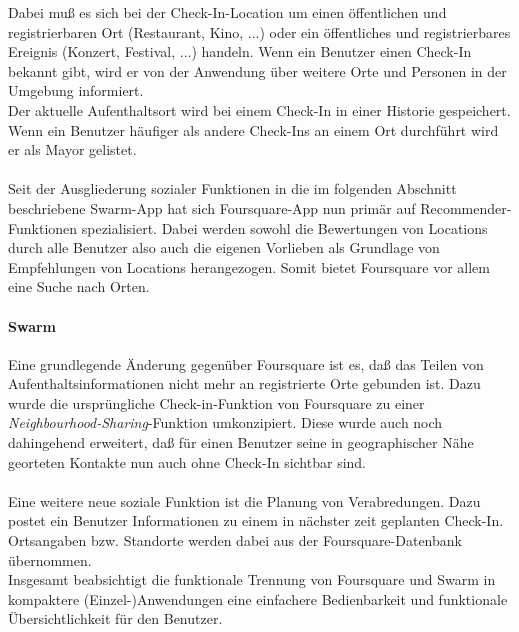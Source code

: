 Dabei muß es sich bei der Check-In-Location um
einen öffentlichen und registrierbaren Ort (Restaurant, Kino, ...) oder ein öffentliches und registrierbares Ereignis (Konzert, Festival, ...) handeln.
Wenn ein Benutzer einen Check-In bekannt gibt, wird er von der Anwendung über weitere Orte und Personen in der Umgebung informiert.\\
Der aktuelle Aufenthaltsort wird bei einem Check-In in einer Historie gespeichert. Wenn 
ein Benutzer häufiger als andere Check-Ins an einem Ort durchführt wird er als Mayor gelistet.\\ \\
Seit der Ausgliederung sozialer Funktionen in die im folgenden Abschnitt beschriebene Swarm-App hat
sich Foursquare-App nun primär auf
Recommender-Funktionen
spezialisiert. Dabei werden sowohl die Bewertungen von Locations durch alle Benutzer also auch die eigenen Vorlieben als Grundlage
von Empfehlungen von Locations herangezogen. Somit bietet Foursquare vor allem eine Suche nach Orten.%

\paragraph[Swarm]{Swarm}
Eine grundlegende Änderung gegenüber Foursquare ist es, daß das Teilen von Aufenthaltsinformationen nicht mehr an registrierte Orte gebunden ist. Dazu wurde die ursprüngliche Check-in-Funktion von Foursquare zu einer \textit{Neighbourhood-Sharing}-Funktion umkonzipiert. Diese wurde auch noch dahingehend erweitert, daß für einen Benutzer seine in geographischer Nähe georteten Kontakte nun auch ohne Check-In sichtbar sind.\\ \\
Eine weitere neue soziale Funktion ist die Planung von Verabredungen. Dazu postet ein Benutzer Informationen zu einem in nächster zeit geplanten Check-In. Ortsangaben bzw. Standorte werden dabei aus der Foursquare-Datenbank übernommen.\\
Insgesamt beabsichtigt die funktionale Trennung von Foursquare und Swarm in kompaktere (Einzel-)Anwendungen eine einfachere Bedienbarkeit und funktionale Übersichtlichkeit für den Benutzer.

